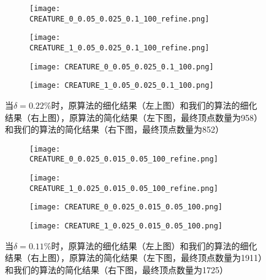 \begin{figure}[H]
  \centering
  \begin{subfigure}[b]{0.4\textwidth}
    \texttt{[image: CREATURE\_0\_0.05\_0.025\_0.1\_100\_refine.png]}
  \end{subfigure}
  \begin{subfigure}[b]{0.4\textwidth}
    \texttt{[image: CREATURE\_1\_0.05\_0.025\_0.1\_100\_refine.png]}
  \end{subfigure}
  \begin{subfigure}[b]{0.4\textwidth}
    \texttt{[image: CREATURE\_0\_0.05\_0.025\_0.1\_100.png]}
  \end{subfigure}
  \begin{subfigure}[b]{0.4\textwidth}
    \texttt{[image: CREATURE\_1\_0.05\_0.025\_0.1\_100.png]}
  \end{subfigure}
  \caption[当$\delta=0.22\%$时banana结果对比]{当$\delta=0.22\%$时，原算法的细化结果（左上图）和我们的算法的细化结果（右上图），原算法的简化结果（左下图，最终顶点数量为958）和我们的算法的简化结果（右下图，最终顶点数量为852）}
  \label{fig:creature-res1}
\end{figure}

\begin{figure}[H]
  \centering
  \begin{subfigure}[b]{0.4\textwidth}
    \texttt{[image: CREATURE\_0\_0.025\_0.015\_0.05\_100\_refine.png]}
  \end{subfigure}
  \begin{subfigure}[b]{0.4\textwidth}
    \texttt{[image: CREATURE\_1\_0.025\_0.015\_0.05\_100\_refine.png]}
  \end{subfigure}
  \begin{subfigure}[b]{0.4\textwidth}
    \texttt{[image: CREATURE\_0\_0.025\_0.015\_0.05\_100.png]}
  \end{subfigure}
  \begin{subfigure}[b]{0.4\textwidth}
    \texttt{[image: CREATURE\_1\_0.025\_0.015\_0.05\_100.png]}
  \end{subfigure}
  \caption[当$\delta=0.11\%$时banana结果对比]{当$\delta=0.11\%$时，原算法的细化结果（左上图）和我们的算法的细化结果（右上图），原算法的简化结果（左下图，最终顶点数量为1911）和我们的算法的简化结果（右下图，最终顶点数量为1725）}
  \label{fig:creature-res2}
\end{figure}

